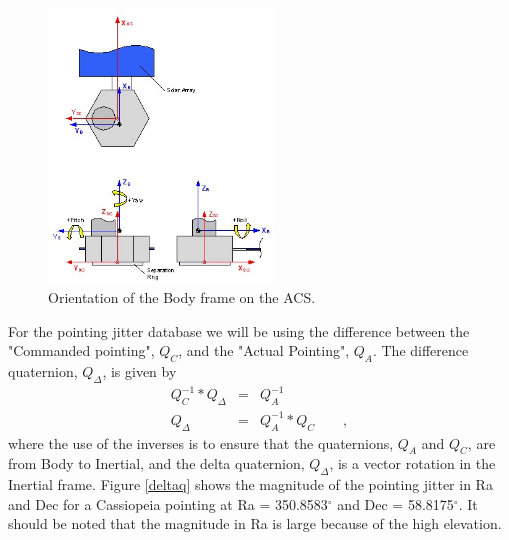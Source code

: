 \begin{figure}[ht]
\begin{center}
\includegraphics[width=6cm]{images/bodyframe.jpg} 
\caption{Orientation of the Body frame on the ACS.}
\label{bodyframe}
\end{center}
\end{figure} 

For the pointing jitter database we will be using the difference between the "Commanded pointing", $Q_C$, and the "Actual Pointing", $Q_A$. The difference quaternion, $Q_\Delta$, is given by
\begin{eqnarray}
Q_C^{-1}*Q_\Delta &=& Q_A^{-1} \\
Q_\Delta &=& Q_A^{-1}*Q_C \qquad ,
\end{eqnarray}
where the use of the inverses is to ensure that the quaternions, $Q_A$ and $Q_C$, are from Body to Inertial, and the delta quaternion, $Q_\Delta$, is a vector rotation in the Inertial frame. Figure \ref{deltaq} shows the magnitude of the pointing jitter in Ra and Dec for a Cassiopeia pointing at Ra = 350.8583$^\circ$ and Dec = 58.8175$^\circ$. It should be noted that the magnitude in Ra is large because of the high elevation.

